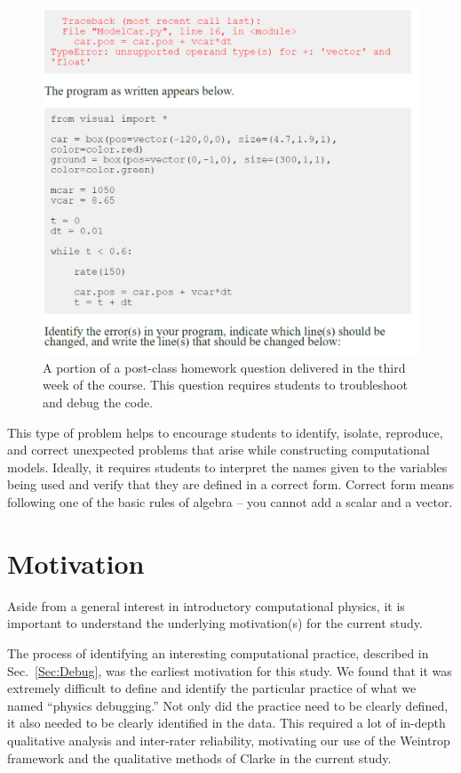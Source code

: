 \documentclass{msuphddissertation}
\begin{document}
\begin{doublespace}
\begin{figure}[ht]\centering
\includegraphics[scale=0.50]{images/CH3PostClassHomework.pdf}
\caption{A portion of a post-class homework question delivered in the third week of the course.  This question requires students to troubleshoot and debug the code.}\label{CH3:PostClassHomework}
\end{figure}

This type of problem helps to encourage students to identify, isolate, reproduce, and correct unexpected problems that arise while constructing computational models.  Ideally, it requires students to interpret the names given to the variables being used and verify that they are defined in a correct form.  Correct form means following one of the basic rules of algebra -- you cannot add a scalar and a vector.

%
%

\chapter{Motivation}\label{CH4:Motivation}

Aside from a general interest in introductory computational physics, it is important to understand the underlying motivation(s) for the current study.

The process of identifying an interesting computational practice, described in Sec.~\ref{Sec:Debug}, was the earliest motivation for this study.  We found that it was extremely difficult to define and identify the particular practice of what we named ``physics debugging.''  Not only did the practice need to be clearly defined, it also needed to be clearly identified in the data.  This required a lot of in-depth qualitative analysis and inter-rater reliability, motivating our use of the Weintrop framework and the qualitative methods of Clarke in the current study.


\end{doublespace}
\end{document}
